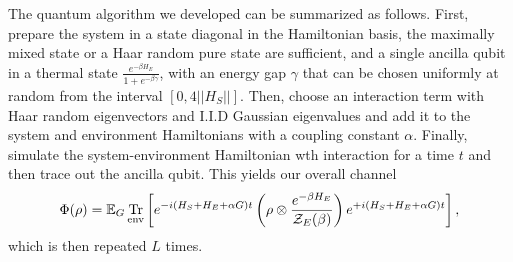 \documentclass[11pt]{article}
\newcommand{\brackets}[1]{\left[ #1 \right]}
\newcommand{\norm}[1]{\left|\left| #1 \right|\right|}
\DeclareMathOperator{\Tr}{Tr}
\newcommand{\partrace}[2]{\Tr_{#1} \brackets{ #2 }}
\newcommand{\partfun}{\mathcal{Z}}
\begin{document}
The quantum algorithm we developed can be summarized as follows. First, prepare the system in a state diagonal in the Hamiltonian basis, the maximally mixed state or a Haar random pure state are sufficient, and a single ancilla qubit in a thermal state $\frac{e^{-\beta H_E}}{1 + e^{-\beta \gamma}}$, with an energy gap $\gamma$ that can be chosen uniformly at random from the interval $[0, 4\norm{H_S}]$. Then, choose an interaction term with Haar random eigenvectors and I.I.D Gaussian eigenvalues and add it to the system and environment Hamiltonians with a coupling constant $\alpha$. Finally, simulate the system-environment Hamiltonian wth interaction for a time $t$ and then trace out the ancilla qubit. This yields our overall channel
\begin{equation}
    \Phi(\rho) = \mathbb{E}_G \partrace{\rm env}{e^{-i(H_S + H_E + \alpha G) t} \left( \rho \otimes \frac{e^{-\beta H_E}}{\partfun_E(\beta)} \right) e^{+i(H_S + H_E + \alpha G) t} }, \label{eq:phi}
\end{equation}
which is then repeated $L$ times.
\end{document}
